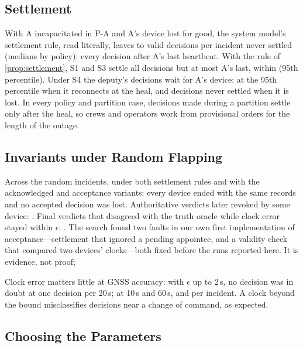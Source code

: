 \subsection{Settlement}
\label{sec:eval-settlement}

With A incapacitated in P-A and A's device lost for good, the system model's settlement
rule, read literally, leaves \tbStrictLostNeverMin{} to \tbStrictLostNeverMax{} valid
decisions per incident never settled (medians by policy): every decision after A's last
heartbeat. With the rule of \cref{prop:settlement}, S1 and S3 settle all decisions but at most A's
last, within \tbClosingSettlePninetyfive{} (95th percentile). Under S4 the deputy's
decisions wait for A's device: \tbSFourSettlePninetyfiveKept{} at the 95th percentile when it
reconnects at the heal, and \tbSFourNeverSettledLost{} decisions never settled when it is
lost. In every policy and partition case, decisions made during a partition settle only
after the heal, so crews and operators work from provisional orders for the length of the
outage. 

\subsection{Invariants under Random Flapping}
\label{sec:eval-search}

Across the \tbSearchRuns{} random incidents, under both settlement rules and with the
acknowledged and acceptance variants: every device ended with the same records and no
accepted decision was lost. Authoritative verdicts later revoked by some device:
\tbSearchRevoked{}. Final verdicts that disagreed with the truth oracle while clock error
stayed within $\epsilon$: \tbSearchMisclassified{}. The search found two faults
in our own first implementation of acceptance---settlement that ignored a pending appointee,
and a validity check that compared two devices' clocks---both fixed before the runs reported
here. It is evidence, not proof; 

Clock error matters little at GNSS accuracy: with $\epsilon$ up to 2\,s, no decision was in
doubt at one decision per 20\,s; at 10\,s and 60\,s, \tbDoubtTen{} and \tbDoubtSixty{} per
incident. A clock beyond the bound misclassifies decisions near a change of command, as
expected.

\subsection{Choosing the Parameters}
\label{sec:eval-parameters}

